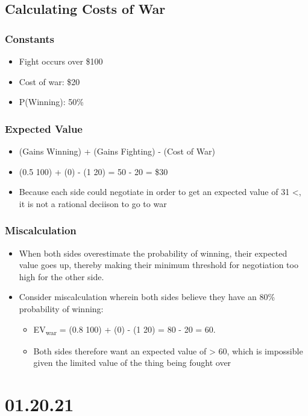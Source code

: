 \documentclass[11pt]{article}
\begin{document}
\subsection{Calculating Costs of War}
\label{sec:orge00adf3}
\subsubsection{Constants}
\label{sec:org47351e6}
\begin{itemize}
\item Fight occurs over \$100
\item Cost of war: \$20
\item P(Winning): 50\%
\end{itemize}
\subsubsection{Expected Value}
\label{sec:orga0c5230}
\begin{itemize}
\item (Gains Winning) + (Gains Fighting) - (Cost of War)
\item (0.5 \texttimes{} 100) + (0) - (1 \texttimes{} 20) = 50 - 20 = \$30
\item Because each side could negotiate in order to get an expected value of 31 <, it is not a rational deciison to go to war
\end{itemize}
\subsubsection{Miscalculation}
\label{sec:orga7c7861}
\begin{itemize}
\item When both sides overestimate the probability of winning, their expected value goes up, thereby making their minimum threshold for negotiation too high for the other side.
\item Consider miscalculation wherein both sides believe they have an 80\% probability of winning:
\begin{itemize}
\item EV\textsubscript{war} = (0.8 \texttimes{} 100) + (0) - (1 \texttimes{} 20) = 80 - 20 = 60.
\item Both sides therefore want an expected value of > 60, which is impossible given the limited value of the thing being fought over
\end{itemize}
\end{itemize}
\section{01.20.21}
\label{sec:org462f528}
\end{document}
